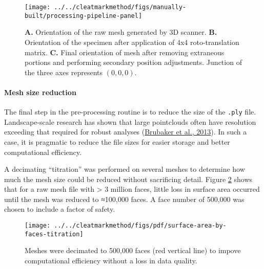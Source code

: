 \documentclass[
  letterpaper,
  openany]{book}
\begin{document}
\begin{figure}

{\centering \texttt{[image: ../../cleatmarkmethod/figs/manually-built/processing-pipeline-panel]} 

}

\caption[Mesh orientation and cleaning pipeline]{\textbf{A.} Orientation of the raw mesh generated by 3D scanner. \textbf{B.} Orientation of the specimen after application of 4x4 roto-translation matrix. \textbf{C.} Final orientation of mesh after removing extraneous portions and performing secondary position adjustments. Junction of the three axes represents \((0,0,0)\).}\label{fig:orienting-and-removing-cyl-fig}
\end{figure}

\hypertarget{mesh-size-reduction}{%
\paragraph{Mesh size reduction}\label{mesh-size-reduction}}

The final step in the pre-processing routine is to reduce the size of the \texttt{.ply} file.
Landscape-scale research has shown that large pointclouds often have resolution exceeding that required for robust analyses (\protect\hyperlink{ref-Brubaker2013}{Brubaker et al., 2013}).
In such a case, it is pragmatic to reduce the file sizes for easier storage and better computational efficiency.

A decimating ``titration'' was performed on several meshes to determine how much the mesh size could be reduced without sacrificing detail.
Figure \ref{fig:decimation-titration-surface-area} shows that for a raw mesh file with \textgreater{} 3 million faces, little loss in surface area occurred until the mesh was reduced to ≈100,000 faces.
A face number of 500,000 was chosen to include a factor of safety.

\begin{figure}

{\centering \texttt{[image: ../../cleatmarkmethod/figs/pdf/surface-area-by-faces-titration]} 

}

\caption[Mesh decimation to reduce file size.]{Meshes were decimated to 500,000 faces (red vertical line) to impove computational efficiency without a loss in data quality.}\label{fig:decimation-titration-surface-area}
\end{figure}
\end{document}
